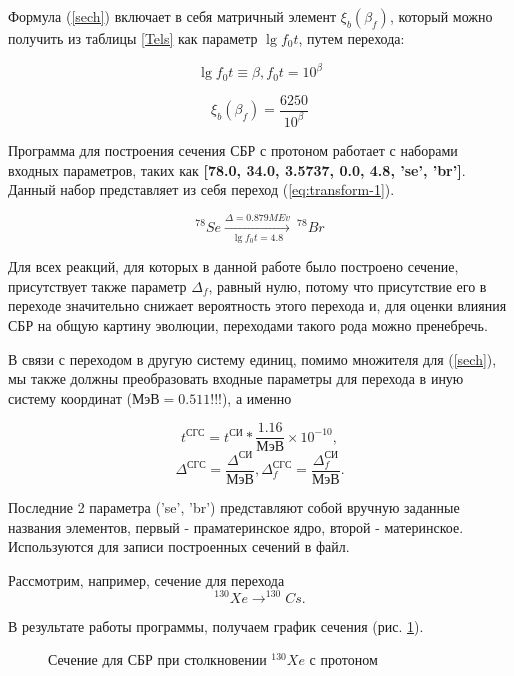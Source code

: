 \documentclass[14pt, a4paper]{article}
\numberwithin{figure}{section}
\numberwithin{equation}{section}
\begin{document}
Формула (\ref{sech}) включает в себя матричный элемент $\xi_b(\beta_f)$, который можно получить из таблицы \ref{Tels} как  параметр $\lg f_0 t$, путем перехода:

$$
\lg f_0 t \equiv \beta, f_0 t = 10^\beta
$$

$$
\xi_b(\beta_f) = \frac{6250}{10^\beta}
$$

Программа для построения сечения СБР с протоном работает с наборами входных параметров, таких как \textbf{[78.0, 34.0, 3.5737, 0.0, 4.8, 'se', 'br']}. Данный набор представляет из себя переход (\ref{eq:transform-1}).

\begin{equation}
\label{eq:transform-1}
^{78}Se \xrightarrow[\lg f_0 t = 4.8]{\Delta = 0.879 MEv}  \ ^{78}Br
\end{equation}

Для всех реакций, для которых в данной работе было построено сечение, присутствует также параметр $\Delta_f$, равный нулю, потому что присутствие его в переходе значительно снижает вероятность этого перехода и, для оценки влияния СБР на общую картину эволюции, переходами такого рода можно пренебречь.

В связи с переходом в другую систему единиц, помимо множителя для (\ref{sech}),  мы также должны преобразовать входные параметры для перехода в иную систему координат ($\text{МэВ} = 0.511 $!!!), а именно

$$
t^{\text{СГС}} = t^{\text{СИ}} * \frac{1.16}{\text{МэВ}} \times 10^{-10},
$$
$$
\Delta^{\text{СГС}} = \frac{\Delta^{\text{СИ}}}{\text{МэВ}}, \Delta_f^{\text{СГС}} = \frac{\Delta_f^{\text{СИ}}}{\text{МэВ}}.
$$

Последние 2 параметра ('se', 'br') представляют собой вручную заданные названия элементов, первый - праматеринское ядро, второй - материнское. Используются для записи построенных сечений в файл. 

Рассмотрим, например, сечение для перехода 
$$^{130}Xe \to ^{130}Cs.$$

В результате работы программы, получаем график сечения  (рис. \ref{ris:1}).

\begin{figure}
	\caption{Сечение для СБР при столкновении $^{130}Xe$ с протоном}
	\label{ris:1}
\end{figure}
\end{document}
